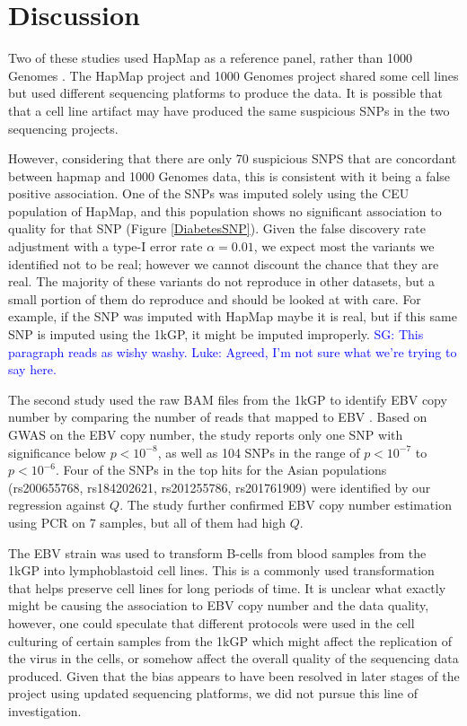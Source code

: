 \documentclass[9pt,lineno]{elife}
\newcommand{\sgcomment}[1]{\textcolor{blue}{SG: #1}}
\newcommand{\luke}[1]{\textcolor{blue}{Luke: #1}}
\begin{document}
\section{Discussion}
Two of these studies used HapMap as a reference panel, rather than 1000 Genomes \citep{Kraja2011, Ebejer2013}. 
The HapMap project and 1000 Genomes project shared some cell lines but used different sequencing platforms to produce the data.
It is possible that that a cell line artifact may have produced the same suspicious SNPs in the two sequencing projects.

However, considering that there are only 70 suspicious SNPS that are concordant between hapmap and 1000 Genomes data, this is consistent with it being a false positive association.
One of the SNPs was imputed solely using the CEU population of HapMap, and this population shows no significant association to quality for that SNP (Figure \ref{DiabetesSNP}).
Given the false discovery rate adjustment with a type-I error rate $\alpha = 0.01$, we expect most the variants we identified not to be real; however we cannot discount the chance that they are real.
The majority of these variants do not reproduce in other datasets, but a small portion of them do reproduce and should be looked at with care. 
For example, if the SNP was imputed with HapMap maybe it is real, but if this same SNP is imputed using the 1kGP, it might be imputed improperly.
\sgcomment{This paragraph reads as wishy washy. }
\luke{Agreed, I'm not sure what we're trying to say here.}

The second study used the raw BAM files from the 1kGP to identify EBV copy number by comparing the number of reads that mapped to EBV \citep{Mandage2017}.
Based on GWAS on the EBV copy number, the study reports only one SNP with significance below $ p < 10^{-8}$, as well as 104 SNPs in the range of $p < 10^{-7}$ to $ p < 10^{-6}$. 
Four of the SNPs in the top hits for the Asian populations (rs200655768, rs184202621, rs201255786, rs201761909) were identified by our regression against $Q$. The study further confirmed EBV copy number estimation using PCR on 7 samples, but all of them had high $Q$.


The EBV strain was used to transform B-cells from blood samples from the 1kGP into lymphoblastoid cell lines.
This is a commonly used transformation that helps preserve cell lines for long periods of time.
It is unclear what exactly might be causing the association to EBV copy number and the data quality, however, one could speculate that different protocols were used in the cell culturing of certain samples from the 1kGP which might affect the replication of the virus in the cells, or somehow affect the overall quality of the sequencing data produced. 
Given that the bias appears to have been resolved in later stages of the project using updated sequencing platforms, we did not pursue this line of investigation. 
\end{document}
